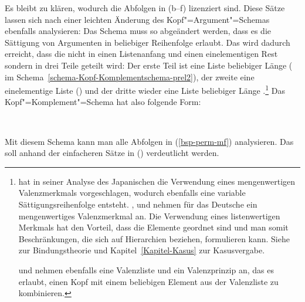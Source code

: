 Es bleibt zu klären, wodurch die Abfolgen in (b--f) lizenziert sind. Diese
Sätze lassen sich nach einer leichten Änderung des Kopf"=Argument"=Schemas ebenfalls
analysieren: Das Schema muss so abgeändert werden, dass es die Sättigung von Argumenten
in beliebiger Reihenfolge erlaubt. Das wird dadurch erreicht, dass die \compsl nicht
in einen Listenanfang und einen einelementigen Rest sondern in drei Teile geteilt wird: Der erste
Teil ist eine Liste beliebiger Länge (\, im Schema~\ref{schema-Kopf-Komplementschema-prel2}), der zweite eine einelementige Liste () und der dritte wieder eine
Liste beliebiger Länge .\footnote{
  \citet{Gunji86a} hat in seiner Analyse des Japanischen die Verwendung eines
  mengenwertigen Valenzmerkmals vorgeschlagen, wodurch ebenfalls eine variable Sättigungsreihenfolge
  entsteht. \citet{HN89a}, \citet{Pollard90a} und \citet*{EEU92a} nehmen für das Deutsche
  ein mengenwertiges Valenzmerkmal an. Die Verwendung eines listenwertigen Merkmals hat den
  Vorteil, dass die Elemente geordnet sind und man somit Beschränkungen, die sich auf
  Hierarchien beziehen, formulieren kann. Siehe  zur Bindungstheorie und
  Kapitel~\ref{Kapitel-Kasus} zur Kasusvergabe. 

  \citet[]{FR92} und \citet[--223]{Kiss95b} nehmen ebenfalls eine Valenzliste und ein Valenzprinzip an, das es erlaubt,
  einen Kopf mit einem beliebigen Element aus der Valenzliste zu kombinieren.%
}
Das Kopf"=Komplement"=Schema hat also folgende Form:
\begin{samepage}
\begin{schema}
\label{schema-Kopf-Komplementschema-prel2}
 \impl\\
\end{schema}
\end{samepage}
Mit diesem Schema kann man alle Abfolgen in (\ref{bsp-perm-mf}) analysieren. Das soll
anhand der einfacheren Sätze in () verdeutlicht werden.
